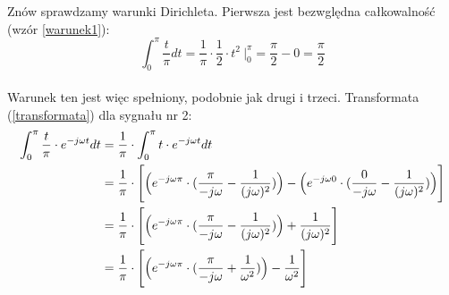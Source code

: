 \documentclass[11pt,a4paper]{article}
\newcounter{liczba1}
\newcounter{liczba2}
\numberwithin{liczba1}{liczba2}
\begin{document}
\setcounter{liczba1}{2}
\setcounter{equation}{1}

Znów sprawdzamy warunki Dirichleta. Pierwsza jest bezwględna całkowalność (wzór \ref{warunek1}):
\begin{equation}
\int_{0}^{\pi} \frac{t}{\pi} dt = \frac{1}{\pi} \cdot \frac{1}{2} \cdot t^2 \ \Bigg|^\pi_0 = \frac{\pi}{2} - 0 = \frac{\pi}{2}
\end{equation} \\

Warunek ten jest więc spełniony, podobnie jak drugi i trzeci. Transformata (\ref{transformata}) dla sygnału nr 2:
\begin{equation}
\begin{split}
\int_{0}^{\pi} \frac{t}{\pi} \cdot e^{-j \omega t} dt
&{} = \frac{1}{\pi} \cdot \int_{0}^{\pi} t \cdot e^{-j \omega t} dt \\
&{} = \frac{1}{\pi} \cdot \Bigg[\Big(e^{-j \omega \pi} \cdot (\frac{\pi}{-j \omega} - \frac{1}{(\-j \omega)^2})\Big) - \Big(e^{-j \omega 0} \cdot (\frac{0}{-j \omega} - \frac{1}{(\-j \omega)^2})\Big)\Bigg] \\
&{} = \frac{1}{\pi} \cdot \Bigg[\Big(e^{-j \omega \pi} \cdot (\frac{\pi}{-j \omega} - \frac{1}{(\-j \omega)^2})\Big) + \frac{1}{(\-j \omega)^2}\Bigg] \\
&{} = \frac{1}{\pi} \cdot \Bigg[\Big(e^{-j \omega \pi} \cdot (\frac{\pi}{-j \omega} + \frac{1}{\omega^2})\Big) - \frac{1}{\omega^2}\Bigg] \\
\end{split}
\end{equation}
\end{document}
